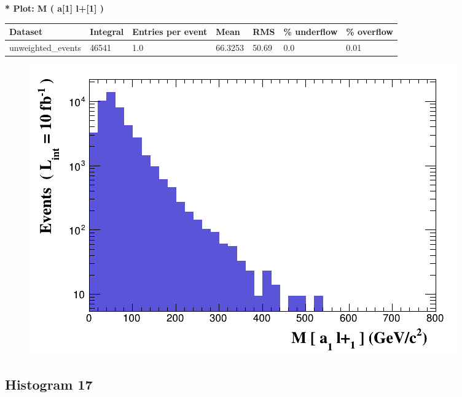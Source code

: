 \documentclass[a4paper, 10pt]{article}
\begin{document}
\textbf{* Plot: M ( a[1] l+[1] ) }\\
   \begin{table}[H]
  \begin{center}
    \begin{tabular}{|m{23.0mm}|m{23.0mm}|m{18.0mm}|m{19.0mm}|m{19.0mm}|m{19.0mm}|m{19.0mm}|}
      \hline
      {\cellcolor{yellow}         Dataset}& {\cellcolor{yellow}         Integral}& {\cellcolor{yellow}         Entries per event}& {\cellcolor{yellow}         Mean}& {\cellcolor{yellow}         RMS}& {\cellcolor{yellow}         \% underflow}& {\cellcolor{yellow}         \% overflow}\\
      \hline
      {\cellcolor{white}         unweighted\_events}& {\cellcolor{white}         46541}& {\cellcolor{white}         1.0}& {\cellcolor{white}         66.3253}& {\cellcolor{white}         50.69}& {\cellcolor{green}         0.0}& {\cellcolor{green}         0.01}\\
\hline
    \end{tabular}
  \end{center}
\end{table}

\begin{figure}[H]
  \begin{center}
    \includegraphics[scale=0.45]{selection_15.png}\\
\caption{   }
  \end{center}
\end{figure}
      \newpage
\subsection{ Histogram 17}
\end{document}
